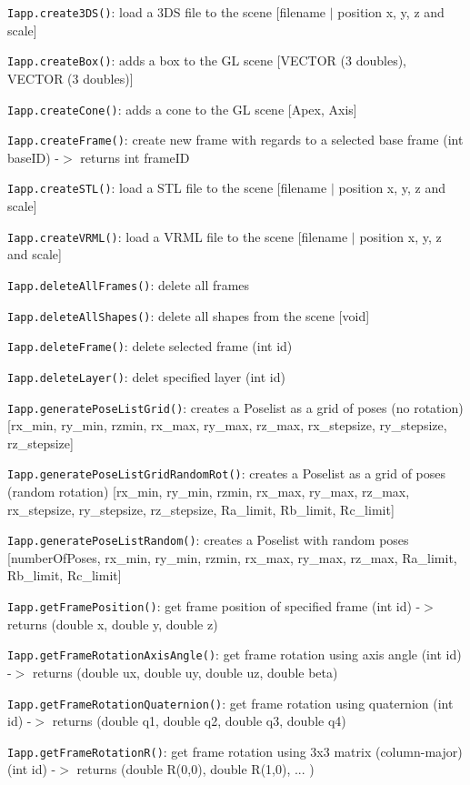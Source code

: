 \documentclass[11pt,a4paper,onepage,openany]{book}
\begin{document}
\texttt{Iapp.create3DS()}: load a 3DS file to the scene [filename $|$ position
x, y, z and scale]

\texttt{Iapp.createBox()}: adds a box to the GL scene [VECTOR (3 doubles),
VECTOR (3 doubles)]

\texttt{Iapp.createCone()}: adds a cone to the GL scene [Apex, Axis]

\texttt{Iapp.createFrame()}: create new frame with regards to a selected base
frame (int baseID) -$>$ returns int frameID

\texttt{Iapp.createSTL()}: load a STL file to the scene [filename $|$ position
x, y, z and scale]

\texttt{Iapp.createVRML()}: load a VRML file to the scene [filename $|$
position x, y, z and scale]

\texttt{Iapp.deleteAllFrames()}: delete all frames

\texttt{Iapp.deleteAllShapes()}: delete all shapes from the scene [void]

\texttt{Iapp.deleteFrame()}: delete selected frame (int id)

\texttt{Iapp.deleteLayer()}: delet specified layer (int id)

\texttt{Iapp.generatePoseListGrid()}: creates a Poselist as a grid of poses (no
rotation) [rx\_min, ry\_min, rzmin, rx\_max, ry\_max, rz\_max, rx\_stepsize,
ry\_stepsize, rz\_stepsize]

\texttt{Iapp.generatePoseListGridRandomRot()}: creates a Poselist as a grid of
poses (random rotation) [rx\_min, ry\_min, rzmin, rx\_max, ry\_max, rz\_max,
rx\_stepsize, ry\_stepsize, rz\_stepsize, Ra\_limit, Rb\_limit, Rc\_limit]

\texttt{Iapp.generatePoseListRandom()}: creates a Poselist with random poses
[numberOfPoses, rx\_min, ry\_min, rzmin, rx\_max, ry\_max, rz\_max, Ra\_limit,
Rb\_limit, Rc\_limit]

\texttt{Iapp.getFramePosition()}: get frame position of specified frame (int
id) -$>$ returns (double x, double y, double z)

\texttt{Iapp.getFrameRotationAxisAngle()}: get frame rotation using axis angle
(int id) -$>$ returns (double ux, double uy, double uz, double beta)

\texttt{Iapp.getFrameRotationQuaternion()}: get frame rotation using quaternion
(int id) -$>$ returns (double q1, double q2, double q3, double q4)

\texttt{Iapp.getFrameRotationR()}: get frame rotation using 3x3 matrix
(column-major) (int id) -$>$ returns (double R(0,0), double R(1,0), ... )
\end{document}
